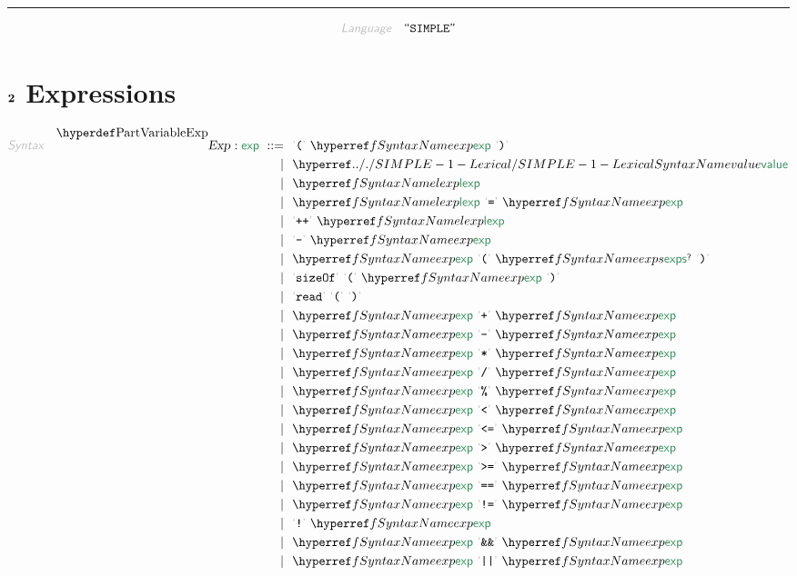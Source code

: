 

\begin{center}
\rule{3in}{0.4pt}
\end{center}

\begin{displaymath}
\KEY{Language} \quad \STRING{SIMPLE}
\end{displaymath}

\section{$\SECT{2}$ Expressions}\hypertarget{sect2-expressions}{}\label{sect2-expressions}

\begin{align*}
  \KEY{Syntax} \quad
    \VARDECL{Exp} : \SYN{exp}
      \ ::= \ & \
      \LEX{{(}} \ \SYNREF{exp} \ \LEX{{)}} \\
      \ \mid \ & \ \SYNHYPER{../.}{SIMPLE-1-Lexical}{value} \\
      \ \mid \ & \ \SYNREF{lexp} \\
      \ \mid \ & \ \SYNREF{lexp} \ \LEX{{=}} \ \SYNREF{exp} \\
      \ \mid \ & \ \LEX{{+}{+}} \ \SYNREF{lexp} \\
      \ \mid \ & \ \LEX{{-}} \ \SYNREF{exp} \\
      \ \mid \ & \ \SYNREF{exp} \ \LEX{{(}} \ \SYNREF{exps}\QUERY \ \LEX{{)}} \\
      \ \mid \ & \ \LEX{sizeOf} \ \LEX{{(}} \ \SYNREF{exp} \ \LEX{{)}} \\
      \ \mid \ & \ \LEX{read} \ \LEX{{(}} \ \LEX{{)}} \\
      \ \mid \ & \ \SYNREF{exp} \ \LEX{{+}} \ \SYNREF{exp} \\
      \ \mid \ & \ \SYNREF{exp} \ \LEX{{-}} \ \SYNREF{exp} \\
      \ \mid \ & \ \SYNREF{exp} \ \LEX{{*}} \ \SYNREF{exp} \\
      \ \mid \ & \ \SYNREF{exp} \ \LEX{{/}} \ \SYNREF{exp} \\
      \ \mid \ & \ \SYNREF{exp} \ \LEX{{\PERCENT}} \ \SYNREF{exp} \\
      \ \mid \ & \ \SYNREF{exp} \ \LEX{{<}} \ \SYNREF{exp} \\
      \ \mid \ & \ \SYNREF{exp} \ \LEX{{<}{=}} \ \SYNREF{exp} \\
      \ \mid \ & \ \SYNREF{exp} \ \LEX{{>}} \ \SYNREF{exp} \\
      \ \mid \ & \ \SYNREF{exp} \ \LEX{{>}{=}} \ \SYNREF{exp} \\
      \ \mid \ & \ \SYNREF{exp} \ \LEX{{=}{=}} \ \SYNREF{exp} \\
      \ \mid \ & \ \SYNREF{exp} \ \LEX{{!}{=}} \ \SYNREF{exp} \\
      \ \mid \ & \ \LEX{{!}} \ \SYNREF{exp} \\
      \ \mid \ & \ \SYNREF{exp} \ \LEX{{\AMPERSAND}{\AMPERSAND}} \ \SYNREF{exp} \\
      \ \mid \ & \ \SYNREF{exp} \ \LEX{{|}{|}} \ \SYNREF{exp}
\end{align*}
